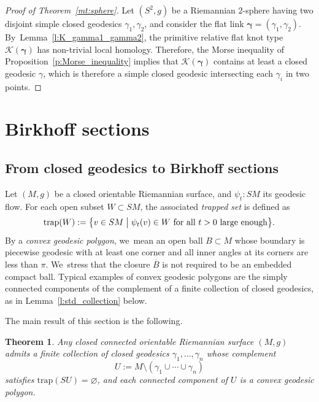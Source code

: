 \documentclass[JEP,XML,SOM,Unicode,NoFloatCountersInSection,published]{cedram}
\let\bm\boldsymbol
\newcommand{\KK}{\mathcal{K}}
\newcommand{\trap}{\mathrm{trap}}
\theoremstyle{plain}
\newtheorem{Thm}{Theorem}[section]
\theoremstyle{definition}
\begin{document}
\begin{proof}[Proof of Theorem~\ref{mt:sphere}]
Let $(S^2,g)$ be a Riemannian $2$-sphere having two disjoint simple closed geodesics $\gamma_1,\gamma_2$, and consider the flat link $\bm\gamma=(\gamma_1,\gamma_2)$. By~Lemma~\ref{l:K_gamma1_gamma2}, the primitive relative flat knot type $\KK(\bm\gamma)$ has non-trivial local homology. Therefore, the Morse inequality of Proposition~\ref{p:Morse_inequality} implies that $\KK(\bm\gamma)$ contains at least a closed geodesic $\gamma$, which is therefore a simple closed geodesic intersecting each $\gamma_i$ in two points.
\end{proof}

\section{Birkhoff sections}
\label{s:Birkhoff_sections}

\subsection{From closed geodesics to Birkhoff sections}

Let $(M,g)$ be a closed orientable Riemannian surface, and $\psi_t:SM$ its geodesic flow. For each open subset $W\subset SM$, the associated \emph{trapped set} is defined as
\begin{align*}
\trap(W) := \bigl\{v\in SM\bigm| \psi_t(v)\in W\mbox{ for all $t>0$ large enough} \bigr\}.
\end{align*}
By a \emph{convex geodesic polygon}, we~mean an open ball $B\subset M$ whose boundary is piecewise geodesic with at least one corner and all inner angles at its corners are less than $\pi$. We~stress that the closure $\overline B$ is not required to be an embedded compact ball. Typical examples of convex geodesic polygons are the simply connected components of the complement of a finite collection of closed geodesics, as in Lemma~\ref{l:std_collection} below.

The main result of this section is the following.

\begin{Thm}\label{t:complete_system}
Any closed connected orientable Riemannian surface $(M,g)$ admits a finite collection of closed geodesics $\gamma_1,\dots,\gamma_n$ whose complement
\[
U:=M\setminus(\gamma_1\cup\cdots\cup\gamma_n)
\]
satisfies $\trap(SU)=\varnothing$, and each connected component of $U$ is a convex geodesic polygon.
\end{Thm}
\end{document}
